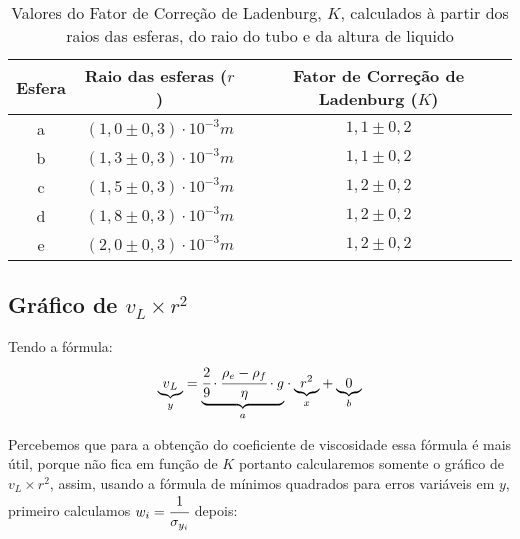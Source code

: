 \documentclass[english,brazil]{article}
\providecommand{\tabularnewline}{\\}
\begin{document}
			\begin{table}[H]
				\caption{Valores do Fator de Correção de Ladenburg, $K$, calculados à partir
				dos raios das esferas, do raio do tubo e da altura de liquido}


				\centering{}%
				\begin{tabular}{|c|c|c|}
					\hline 
					Esfera  & Raio das esferas ($r$)  & Fator de Correção de Ladenburg ($K$)\tabularnewline
					\hline 
					a  & $(1,0\pm0,3)\cdot10^{-3}\unit{m}$  & $1,1\pm0,2$\tabularnewline
					\hline 
					b  & $(1,3\pm0,3)\cdot10^{-3}\unit{m}$  & $1,1\pm0,2$\tabularnewline
					\hline 
					c  & $(1,5\pm0,3)\cdot10^{-3}\unit{m}$  & $1,2\pm0,2$\tabularnewline
					\hline 
					d  & $(1,8\pm0,3)\cdot10^{-3}\unit{m}$  & $1,2\pm0,2$\tabularnewline
					\hline 
					e  & $(2,0\pm0,3)\cdot10^{-3}\unit{m}$  & $1,2\pm0,2$\tabularnewline
					\hline 
				\end{tabular}
			\end{table}

		\subsection{Gráfico de $v_{L}\times r^{2}$}

			Tendo a fórmula: \foreignlanguage{english}{ 
			\[
			\underset{y}{\underbrace{v{}_{L}}}=\underset{a}{\underbrace{\cfrac{2}{9}\cdot\cfrac{\rho_{e}-\rho_{f}}{\eta}\cdot g}}\cdot\underset{x}{\underbrace{r^{2}}}+\underset{b}{\underbrace{0}}
			\]
			}

			Percebemos que para a obtenção do coeficiente de viscosidade essa
			fórmula é mais útil, porque não fica em função de $K$ portanto calcularemos
			somente o gráfico de $v_{L}\times r^{2}$, assim, usando a fórmula
			de mínimos quadrados para erros variáveis em $y$, primeiro calculamos
			$w_{i}=\cfrac{1}{\sigma_{y_{i}}}$ depois:
\end{document}
